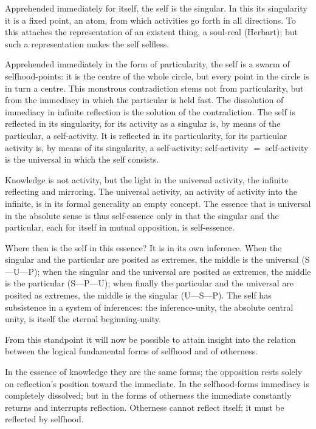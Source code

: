 \documentclass[12pt]{book}
\begin{document}
Apprehended immediately for itself, the self is the singular. In
this its singularity it is a fixed point, an atom, from which
activities go forth in all directions. To this attaches the
representation of an existent thing, a soul-real (Herbart); but such
a representation makes the self selfless.

Apprehended immediately in the form of particularity, the self is a
swarm of selfhood-points: it is the centre of the whole circle, but
every point in the circle is in turn a centre. This monstrous
contradiction stems not from particularity, but from the immediacy
in which the particular is held fast. The dissolution of immediacy
in infinite reflection is the solution of the contradiction. The
self is reflected in its singularity, for its activity as a singular
is, by means of the particular, a self-activity. It is reflected in
its particularity, for its particular activity is, by means of its
singularity, a self-activity: self-activity $=$ self-activity is the
universal in which the self consists.

Knowledge is not activity, but the light in the universal activity,
the infinite reflecting and mirroring. The universal activity, an
activity of activity into the infinite, is in its formal generality
an empty concept. The essence that is universal in the absolute
sense is thus self-essence only in that the singular and the
particular, each for itself in mutual opposition, is self-essence.

Where then is the self in this essence? It is in its own inference.
When the singular and the particular are posited as extremes, the
middle is the universal (S---U---P); when the singular and the
universal are posited as extremes, the middle is
the particular (S---P---U); when finally the particular and the
universal are posited as extremes, the middle is the singular
(U---S---P).
The self has subsistence in a system of inferences: the
inference-unity, the absolute central unity, is itself the eternal
beginning-unity.

From this standpoint it will now be possible to attain insight into
the relation between the logical fundamental forms of selfhood and
of otherness.

In the essence of knowledge they are the same forms; the opposition
rests solely on reflection's position toward the immediate. In the
selfhood-forms immediacy is completely dissolved; but in the forms
of otherness the immediate constantly returns and interrupts
reflection. Otherness cannot reflect itself; it must be reflected by
selfhood.
\end{document}
